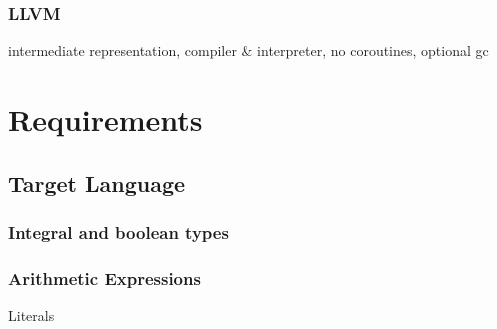 		
		\subsection{LLVM}
		
		intermediate representation, compiler \& interpreter, no coroutines, optional gc
		
		

\chapter{Requirements}\label{requirements}

	

    \section{Target Language}
    
        \subsection{Integral and boolean types}
    
        \subsection{Arithmetic Expressions}
        
            Literals
            
